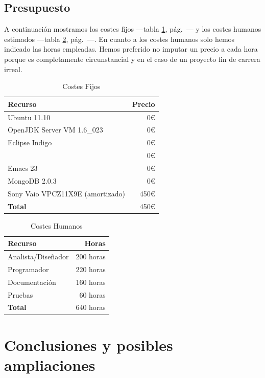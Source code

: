 \subsection{Presupuesto}

A continuación mostramos los costes fijos ---tabla \ref{fixed_costs},
pág.~\pageref{fixed_costs}--- y los costes humanos estimados ---tabla
\ref{human_costs}, pág.~\pageref{human_costs}---. En cuanto a los
costes humanos solo hemos indicado las horas empleadas. Hemos
preferido no imputar un precio a cada hora porque es completamente
circunstancial y en el caso de un proyecto fin de carrera irreal.
\newpage
\begin{table}[hbp]
\begin{tabularx}{\textwidth}{X r}
\textbf{Recurso} & \textbf{Precio} \\\hline
Ubuntu 11.10 & 0€ \\
OpenJDK Server VM 1.6\_023 & 0€ \\
Eclipse Indigo & 0€ \\
\XeLaTeX{}  & 0€ \\
Emacs 23 & 0€ \\
MongoDB 2.0.3 & 0€ \\
Sony Vaio VPCZ11X9E (amortizado) & 450€ \\
\textbf{Total} & 450€ \\
\end{tabularx}
\caption{Costes Fijos}
\label{fixed_costs}
\end{table}

\begin{table}[hbp]
\begin{tabularx}{\textwidth}{X r}

\textbf{Recurso} & \textbf{Horas} \\ \hline
Analista/Diseñador & 200 horas\\
Programador & 220 horas \\
Documentación & 160 horas \\
Pruebas & 60 horas \\
\textbf{Total} & 640 horas \\
\end{tabularx}
\caption{Costes Humanos}
\label{human_costs}
\end{table}

\section{Conclusiones y posibles ampliaciones}


